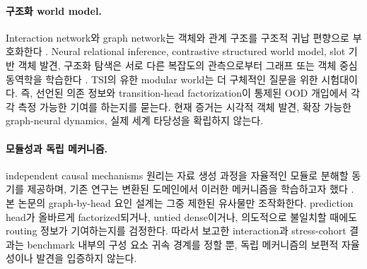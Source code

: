 \paragraph{구조화 world model.}
Interaction network와 graph network는 객체와 관계 구조를 구조적 귀납 편향으로
부호화한다 \citep{battaglia2016interaction,battaglia2018relational}.
Neural relational inference, contrastive structured world model, slot 기반
객체 발견, 구조화 탐색은 서로 다른 복잡도의 관측으로부터 그래프 또는 객체 중심
동역학을 학습한다
\citep{kipf2018nri,kipf2020contrastive,locatello2020slot,
sancaktar2022curious}. TSI의 유한 modular world는 더 구체적인 질문을 위한
시험대이다. 즉, 선언된 의존 정보와 transition-head factorization이 통제된 OOD
개입에서 각각 측정 가능한 기여를 하는지를 묻는다. 현재 증거는 시각적 객체 발견,
확장 가능한 graph-neural dynamics, 실제 세계 타당성을 확립하지 않는다.

\paragraph{모듈성과 독립 메커니즘.}
independent causal mechanisms 원리는 자료 생성 과정을 자율적인 모듈로 분해할
동기를 제공하며, 기존 연구는 변환된 도메인에서 이러한 메커니즘을 학습하고자 했다
\citep{parascandolo2018independent}. 본 논문의 graph-by-head 요인 설계는 그중
제한된 유사물만 조작화한다. prediction head가 올바르게 factorized되거나, untied
dense이거나, 의도적으로 불일치할 때에도 routing 정보가 기여하는지를 검정한다.
따라서 보고한 interaction과 stress-cohort 결과는 benchmark 내부의 구성 요소
귀속 경계를 정할 뿐, 독립 메커니즘의 보편적 자율성이나 발견을 입증하지 않는다.
